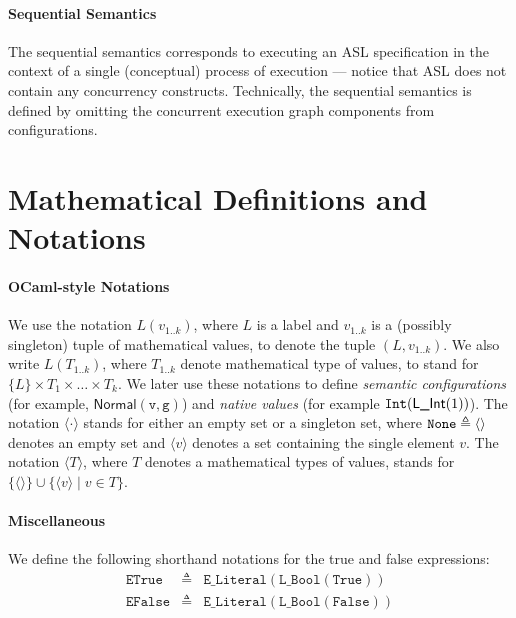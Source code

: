 \documentclass{book}
\newcommand\nvint[0]{\texttt{Int}}
\newcommand\Normal[0]{\textsf{Normal}}
\newcommand\vg[0]{\texttt{g}}
\newcommand\vv[0]{\texttt{v}}
\begin{document}
\paragraph{Sequential Semantics}
The sequential semantics corresponds to executing an ASL specification in the context of a single (conceptual) process
of execution --- notice that ASL does not contain any concurrency constructs.
%
Technically, the sequential semantics is defined by omitting the concurrent execution graph components
from configurations.

\section{Mathematical Definitions and Notations}



\paragraph{OCaml-style Notations}
We use the notation $L(v_{1..k})$, where $L$ is a label and $v_{1..k}$ is a (possibly singleton) tuple of mathematical values,
to denote the tuple $(L,v_{1..k})$.
We also write $L(T_{1..k})$, where $T_{1..k}$ denote mathematical type of values, to stand for
$\{L\} \times T_1 \times \ldots \times T_k$.
%
We later use these notations to define \emph{semantic configurations} (for example, $\Normal(\vv, \vg)$)
and \emph{native values} (for example $\nvint(\lint(1))$).
%
The notation $\langle \cdot \rangle$ stands for either an empty set or a singleton set,
where $\texttt{None}\triangleq\langle\rangle$ denotes an empty set
and $\langle v \rangle$ denotes a set containing the single element $v$.
%
The notation $\langle T \rangle$, where $T$ denotes a mathematical types of values, stands for
$\{ \langle\rangle \} \cup \{\langle v \rangle \;|\; v \in T\}$.

\paragraph{Miscellaneous}
We define the following shorthand notations for the true and false expressions:
\newcommand\etrue[0]{\texttt{ETrue}}
\newcommand\efalse[0]{\texttt{EFalse}}
\[
\begin{array}{rcl}
  \etrue &\triangleq& \texttt{E\_Literal}(\texttt{L\_Bool}(\texttt{True}))\\
  \efalse &\triangleq& \texttt{E\_Literal}(\texttt{L\_Bool}(\texttt{False}))\\
\end{array}
\]
\end{document}
